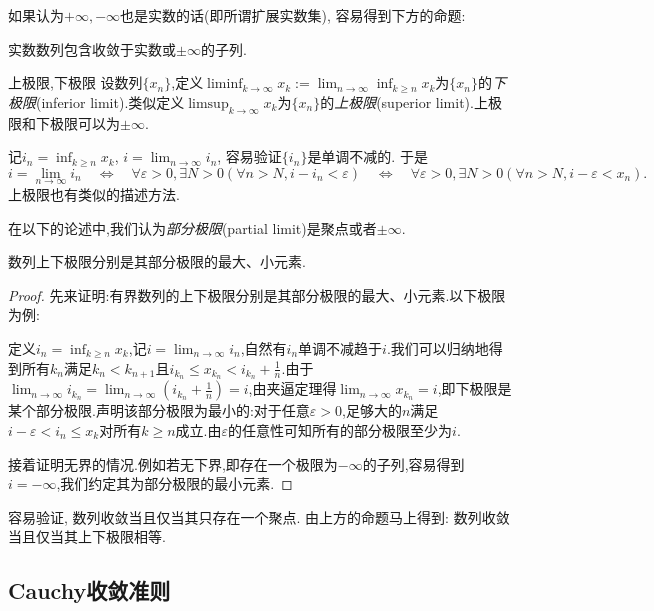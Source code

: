 如果认为$+\infty ,-\infty$也是实数的话(即所谓扩展实数集), 容易得到下方的命题:

\begin{proposition}{}
	实数数列包含收敛于实数或$\pm \infty$的子列.
\end{proposition}

\begin{definition}{上极限,下极限}
	设数列$\{ x_n \}$,定义$\liminf_{k\to \infty} x_k:=\lim_{n\to \infty} \inf_{k \geq n} x_k$为$\{ x_n \}$的\textit{下极限}(inferior limit).类似定义$\limsup_{k\to \infty} x_k$为$\{ x_n \}$的\textit{上极限}(superior limit).上极限和下极限可以为$\pm \infty$.
\end{definition}

记$i_n=\inf_{k\geq n}x_k$, $i=\lim_{n\to \infty} i_{n}$, 容易验证$\{ i_n \}$是单调不减的. 于是$$i=\lim_{n\to \infty} i_{n} \quad \Leftrightarrow \quad \forall \varepsilon >0, \exists N>0 (\forall n>N, i-i_n<\varepsilon) \quad \Leftrightarrow \quad \forall \varepsilon >0, \exists N>0 (\forall n>N, i-\varepsilon<x_n).$$
上极限也有类似的描述方法. 

在以下的论述中,我们认为\textit{部分极限}(partial limit)是聚点或者$\pm \infty$.

\begin{proposition}{}
	数列上下极限分别是其部分极限的最大、小元素.
\end{proposition}
\begin{proof}
	先来证明:有界数列的上下极限分别是其部分极限的最大、小元素.以下极限为例:
	
	定义$i_n=\inf_{k\geq n}x_k$,记$i=\lim_{n\to \infty} i_{n}$,自然有$i_n$单调不减趋于$i$.我们可以归纳地得到所有$k_n$满足$k_n<k_{n+1}$且$i_{k_n} \leq x_{k_n} < i_{k_n}+\frac{1}{n}$.由于$\lim_{n\to \infty} i_{k_n} = \lim_{n\to \infty} (i_{k_n}+\frac{1}{n} ) = i$,由夹逼定理得$\lim_{n\to \infty} x_{k_n}=i$,即下极限是某个部分极限.声明该部分极限为最小的:对于任意$\varepsilon >0$,足够大的$n$满足$i-\varepsilon < i_n \leq x_k$对所有$k \geq n$成立.由$\varepsilon$的任意性可知所有的部分极限至少为$i$.
	
	接着证明无界的情况.例如若无下界,即存在一个极限为$-\infty$的子列,容易得到$i=-\infty$,我们约定其为部分极限的最小元素.
\end{proof}

容易验证, 数列收敛当且仅当其只存在一个聚点. 由上方的命题马上得到: 数列收敛当且仅当其上下极限相等. 

\subsection{Cauchy收敛准则}

